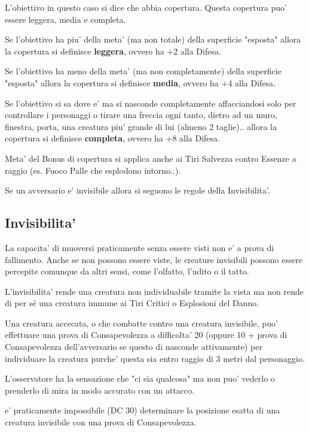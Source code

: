 \documentclass[a4paper,11pt,twoside,openany]{book}
\begin{document}
L'obiettivo in questo caso si dice che abbia copertura. Questa copertura puo' essere leggera, media e completa.

Se l'obiettivo ha piu' della meta' (ma non totale) della superficie "esposta" allora la copertura si definisce \textbf{leggera}, ovvero ha +2 alla Difesa.

Se l'obiettivo ha meno della meta' (ma non completamente) della superficie "esposta" allora la copertura si definisce \textbf{media}, ovvero ha +4 alla Difesa.

Se l'obiettivo si sa dove e' ma si nasconde completamente affacciandosi solo per controllare i personaggi o tirare una freccia ogni tanto, dietro ad un muro, finestra, porta, una creatura piu' grande di lui (almeno 2 taglie).. allora la copertura si definisce \textbf{completa}, ovvero ha +8 alla Difesa.

Meta' del Bonus di copertura si applica anche ai Tiri Salvezza contro
Essenze a raggio (es. Fuoco Palle che esplodono intorno..).

Se un avversario e' invisibile allora si seguono le regole della Invisibilita'.

\subsection{Invisibilita'}

\label{invisibilita}

La capacita' di muoversi praticamente senza essere visti non e' a prova di fallimento. Anche se non possono essere viste, le creature invisibili possono essere percepite comunque da altri sensi, come l'olfatto, l'udito o il tatto.

L'invisibilita' rende una creatura non individuabile tramite la vista ma non rende di per sé una creatura immune ai Tiri Critici o Esplosioni del Danno.

Una creatura accecata, o che combatte contro una creatura invisibile, puo' effettuare una prova di Consapevolezza a difficolta' 20 (oppure 10 + prova di Consapevolezza dell'avversario se questo di nasconde attivamente) per individuare la creatura purche' questa sia entro raggio di 3 metri dal personaggio.

L'osservatore ha la sensazione che "ci sia qualcosa" ma non puo' vederlo o prenderlo di mira in modo accurato con un attacco.

e' praticamente impossibile (DC 30) determinare la posizione esatta di una creatura invisibile con una prova di Consapevolezza.
\end{document}
